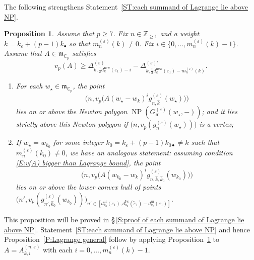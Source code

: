 \documentclass[12pt]{amsart}
\newtheorem{proposition}[subsection]{Proposition}
\theoremstyle{definition}
\numberwithin{equation}{subsection}
\def\gothm{\mathfrak{m}}
\def\CC{\mathbb{C}}
\def\ZZ{\mathbb{Z}}
\DeclareMathOperator{\NP}{NP}
\newcommand{\bbsigma}{\boldsymbol{\sigma}}
\newcommand{\new}{\mathrm{new}}
\newcommand{\Iw}{\mathrm{Iw}}
\newcommand{\ur}{\mathrm{ur}}
\begin{document}
The following strengthens Statement~\ref{ST:each summand of Lagrange lie above NP}.
\begin{proposition}
\label{P:each summand of Lagrange lie above NP} Assume that $p \geq 7$.
Fix $n\in \ZZ_{\geq 1}$ and a weight $k = k_\varepsilon+(p-1)k_\bullet$ so that $m_n^{(\varepsilon)}(k) \neq 0$.
Fix $i \in\{0, \dots, m_n^{(\varepsilon)}(k)-1\}$. Assume that $A \in \gothm_{\CC_p}$ satisfies
\begin{equation}
\label{E:v(A) bigger than Lagrange bound}
v_p(A) \geq \Delta^{(\varepsilon)}_{k,\frac 12 d_{k}^\new(\varepsilon_1) -i} - \Delta^{(\varepsilon)\prime}_{k, \frac 12 d_{k}^\mathrm{new}(\varepsilon_1) - m_n^{(\varepsilon)}(k)}.
\end{equation}
\begin{enumerate}
\item For each $w_\star \in \gothm_{\CC_p}$, the point
$$\big(n, v_p\big(A(w_\star - w_k)^i  g^{(\varepsilon)}_{n,\hat k}(w_\star) \big) \big)$$
    lies on or above the Newton polygon $\NP(G_{\bbsigma}^{(\varepsilon)}(w_\star, -))$; and it lies strictly above this Newton polygon if $\big(n, v_p(g_n^{(\varepsilon)}(w_\star))\big)$ is a vertex;
\item If $w_\star=w_{k_0}$ for some integer $k_0 = k_\varepsilon +(p-1)k_{0\bullet} \neq k$ such that $m_n^{(\varepsilon)}(k_0)\neq 0$, we have an analogous statement: assuming condition \eqref{E:v(A) bigger than Lagrange bound},  the point
$$\big(n, v_p\big(A(w_{k_0} - w_k)^i  g^{(\varepsilon)}_{n,\hat k, \hat k_0}(w_{k_0}) \big) \big)$$
lies on or above the lower convex hull of points $\big(n', v_p(g^{(\varepsilon)}_{n', \hat k_0}(w_{k_0}))\big)_{n' \in [d_{k_0}^\ur(\varepsilon_1), d_{k_0}^\Iw(\tilde \varepsilon_1) - d_{k_0}^\ur(\varepsilon_1)]}$.
\end{enumerate}



\end{proposition}
This proposition will be proved in \S\,\ref{S:proof of each summand of Lagrange lie above NP}.
Statement~\ref{ST:each summand of Lagrange lie above NP} and hence Proposition~\ref{P:Lagrange general} follow by applying  Proposition~\ref{P:each summand of Lagrange lie above NP}
to $A = A_{k,i}^{(n,\varepsilon)}$ with each $i =0, \dots, m_n^{(\varepsilon)}(k)-1$.
\end{document}

